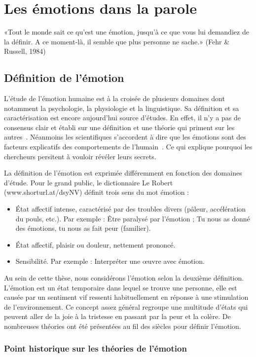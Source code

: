 \chapter{Les émotions dans la parole}
\label{chapitre1}
 	«Tout le monde sait ce qu’est une émotion, jusqu’à ce que vous lui demandiez de la définir. A ce moment-là, il semble que plus personne ne sache.» (Fehr \& Russell, 1984)


 \section{Définition de l'émotion}
L'étude de l'émotion humaine est à la croisée de plusieurs domaines dont notamment la psychologie, la physiologie et la linguistique. Sa définition et sa caractérisation est encore aujourd'hui source d'études. En effet, il n'y a pas de consensus clair et établi sur une définition et une théorie qui priment sur les autres~\cite{Kleinginna1981,Strongman1996}. Néanmoins les scientifiques s'accordent à dire que les émotions sont des facteurs explicatifs des comportements de l'humain~\cite{Gorman2003}. Ce qui explique pourquoi les chercheurs persitent à vouloir révéler leurs secrets.

La définition de l'émotion est exprimée différemment en fonction des domaines d'étude. Pour le grand public, le dictionnaire Le Robert (www.shorturl.at/dsyNV) définit trois sens du mot émotion :
\begin{itemize}
    \item État affectif intense, caractérisé par des troubles divers (pâleur, accélération du pouls, etc.). Par exemple : Être paralysé par l'émotion ; Tu nous as donné des émotions, tu nous as fait peur (familier).
    \item État affectif, plaisir ou douleur, nettement prononcé.
    \item Sensibilité. Par exemple : Interpréter une œuvre avec émotion.
\end{itemize}
Au sein de cette thèse, nous considérons l'émotion selon la deuxième définition. L'émotion est un état temporaire dans lequel se trouve une personne, elle est causée par un sentiment vif ressenti habituellement en réponse à une stimulation de l'environnement. Ce concept assez général regroupe une multitude d'états qui peuvent aller de la joie à la tristesse en passant par la peur et la colère. De nombreuses théories ont été présentées au fil des siècles pour définir l'émotion.

\subsection{Point historique sur les théories de l'émotion}


